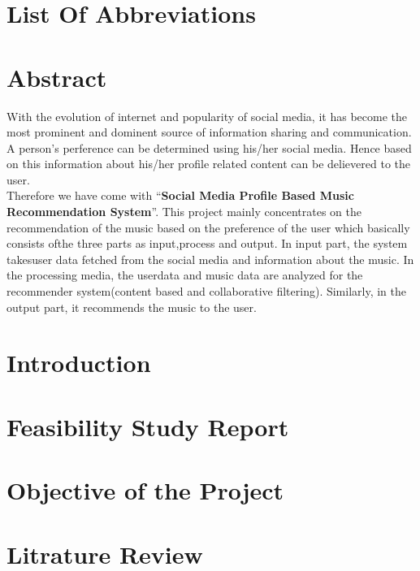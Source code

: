 \documentclass{article}
\begin{document}
\tableofcontents
\thispagestyle{empty}
\cleardoublepage

\listoftables
\thispagestyle{empty}
\cleardoublepage

\listoffigures
\thispagestyle{empty}
\cleardoublepage

\section*{List Of Abbreviations}
\thispagestyle{empty}
\cleardoublepage

\section*{Abstract}
With the evolution of internet and popularity of social media, it has become the most prominent and dominent source of information sharing and communication. A person's perference can be determined using his/her social media. Hence based on this information about his/her profile related content can be delievered to the user.\\
Therefore we have come with ``\textbf{Social Media Profile Based Music Recommendation System}''. This project mainly concentrates on the recommendation of the music based on the preference of the user which basically consists ofthe three parts as input,process and output. In input part, the system takesuser data fetched from the social media and information about the music. In the processing media, the userdata and music data are analyzed for the recommender system(content based and collaborative filtering). Similarly, in the output part, it recommends the music to the user.
\thispagestyle{empty}
\cleardoublepage
{}
\section{Introduction}
	
\cleardoublepage

\section{Feasibility Study Report}
\cleardoublepage

\section{Objective of the Project}
\cleardoublepage

\section{Litrature Review}
\cleardoublepage
\end{document}
